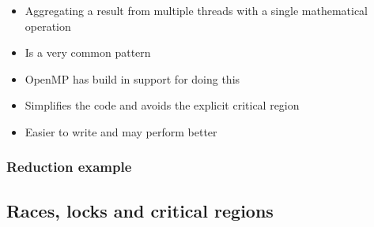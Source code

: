 \begin{itemize}
\itemsep1pt\parskip0pt
\item
  Aggregating a result from multiple threads with a single mathematical
  operation
\item
  Is a very common pattern
\item
  OpenMP has build in support for doing this
\item
  Simplifies the code and avoids the explicit critical region
\item
  Easier to write and may perform better
\end{itemize}

\subsubsection{Reduction example}\label{reduction-example}

\begin{Shaded}
\begin{Highlighting}[]

   
\NormalTok{\{}
     
      \NormalTok{;}
      

    \NormalTok{;}
    \NormalTok{;}

    \NormalTok{\{}
         \NormalTok{(} 
        \NormalTok{\{}
            \NormalTok{);}
            \NormalTok{/(} 
        \NormalTok{\}}
    \NormalTok{\}}
     
\NormalTok{\}}
\end{Highlighting}
\end{Shaded}

\subsection{Races, locks and critical
regions}\label{races-locks-and-critical-regions}

